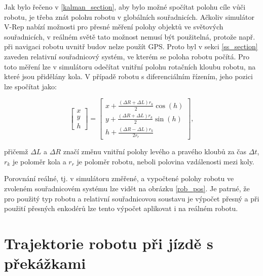 \documentclass[twoside]{ctuthesis}
\theoremstyle{plain}
\theoremstyle{definition}
\theoremstyle{note}
\begin{document}
Jak bylo řečeno v \ref{kalman_section}, aby bylo možné spočítat polohu cíle vůči robotu, je třeba znát polohu robotu v globálních souřadnicích. Ačkoliv simulátor V-Rep nabízí možnosti pro přesné měření polohy objektů ve světových souřadnicích, v reálném světě tato možnost nemusí být použitelná, protože např. při navigaci robotu uvnitř budov nelze použít GPS. Proto byl v sekci \ref{ss_section} zaveden relativní souřadnicový systém, ve kterém se poloha robotu počítá. Pro toto měření lze v simulátoru odečítat vnitřní polohu rotačních kloubu robotu, na které jsou přidělány kola. V případě robotu s diferenciálním řízením, jeho pozici lze spočítat jako:

\begin{equation}
\begin{bmatrix}
x\\
y\\
h
\end{bmatrix} =
\begin{bmatrix}
x + \frac{(\Delta R + \Delta L)r_{k}}{2}\cos(h)\\
y + \frac{(\Delta R + \Delta L)r_{k}}{2}\sin(h)\\
h + \frac{(\Delta R - \Delta L)r_k}{2r_r}
\end{bmatrix},
\end{equation}

přičemž $\Delta L$ a $\Delta R$ značí změnu vnitřní polohy levého a pravého kloubů za čas $\Delta t$, $r_k$ je poloměr kola a $r_r$ je poloměr robotu, neboli polovina vzdálenosti mezi koly.

Porovnání reálné, tj. v simulátoru změřené, a vypočtené polohy robotu ve zvoleném souřadnicovém systému lze vidět na obrázku \ref{rob_pos}. Je patrné, že pro použitý typ robotu a relativní souřadnicovou soustavu je výpočet přesný a při použití přesných enkodérů lze tento výpočet aplikovat i na reálném robotu.

\section{Trajektorie robotu při jízdě s překážkami}
\end{document}
